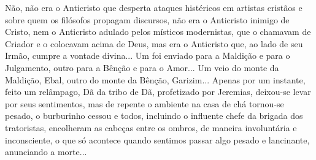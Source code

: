Não, não era o Anticristo que desperta ataques histéricos em artistas
cristãos e sobre quem os filósofos propagam discursos, não era o
Anticristo inimigo de Cristo, nem o Anticristo adulado pelos místicos
modernistas, que o chamavam de Criador e o colocavam acima de Deus, mas
era o Anticristo que, ao lado de seu Irmão, cumpre a vontade divina...
Um foi enviado para a Maldição e para o Julgamento, outro para a Bênção
e para o Amor... Um veio do monte da Maldição, Ebal, outro do monte da
Bênção, Garizim... Apenas por um instante, feito um relâmpago, Dã da
tribo de Dã, profetizado por Jeremias, deixou-se levar por seus
sentimentos, mas de repente o ambiente na casa de chá tornou-se pesado,
o burburinho cessou e todos, incluindo o influente chefe da brigada dos
tratoristas, encolheram as cabeças entre os ombros, de maneira
involuntária e inconsciente, o que só acontece quando sentimos passar
algo pesado e lancinante, anunciando a morte...

